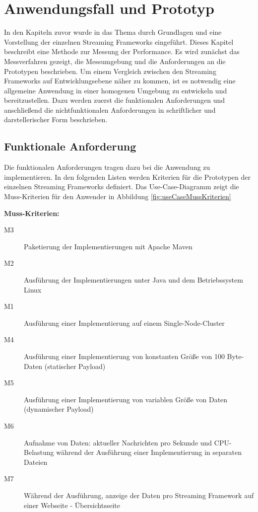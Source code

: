 \chapter{Anwendungsfall und Prototyp}
\label{chapter:prototype}

In den Kapiteln zuvor wurde in das Thema durch Grundlagen und eine Vorstellung der einzelnen Streaming Frameworks eingeführt. Dieses Kapitel beschreibt eine Methode zur Messung der Performance. Es wird zunächst das Messverfahren gezeigt, die Messumgebung und die Anforderungen an die Prototypen beschrieben. Um einem Vergleich zwischen den Streaming Frameworks auf Entwicklungsebene näher zu kommen, ist es notwendig eine allgemeine Anwendung in einer homogenen Umgebung zu entwickeln und bereitzustellen. Dazu werden zuerst die funktionalen Anforderungen und anschließend die nichtfunktionalen Anforderungen in schriftlicher und darstellerischer Form beschrieben.

\section{Funktionale Anforderung}
\label{sec:funktAnforderung}
Die funktionalen Anforderungen tragen dazu bei die Anwendung zu implementieren. In den folgenden Listen werden Kriterien für die Prototypen der einzelnen Streaming Frameworks definiert. Das Use-Case-Diagramm zeigt die Muss-Kriterien für den Anwender in Abbildung \ref{fig:useCaseMussKriterien}

\textbf{Muss-Kriterien:}
\begin{description}
  \item[M3] Paketierung der Implementierungen mit Apache Maven	
	\item[M2] Ausführung der Implementierungen unter Java und dem Betriebssystem Linux
	\item[M1] Ausführung einer Implementierung auf einem Single-Node-Cluster	
	\item[M4] Ausführung einer Implementierung von konstanten Größe von 100 Byte-Daten (statischer Payload)
	\item[M5] Ausführung einer Implementierung von variablen Größe von Daten (dynamischer Payload)
	\item[M6] Aufnahme von Daten: aktueller Nachrichten pro Sekunde und CPU-Belastung während der Ausführung einer Implementierung in  separaten Dateien 
	\item[M7] Während der Ausführung, anzeige der Daten pro Streaming Framework auf einer Webseite - Übersichtsseite
\end{description}

